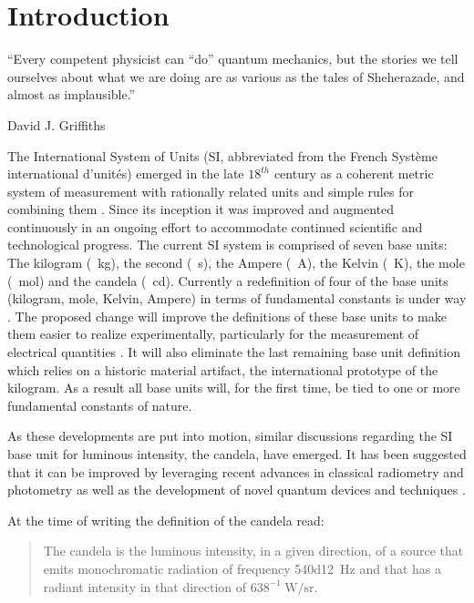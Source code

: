 

\chapter{Introduction}	\label{ch::introduction}

		\epigraph{``Every competent physicist can \enquote{do} quantum mechanics, but the stories we tell ourselves about what we are doing are as various as the tales of Sheherazade, and almost as implausible.''}{\textup{David J. Griffiths}}

		The International System of Units (SI, abbreviated from the French Syst\`eme international d'unit\'es) emerged in the late $18^{th}$ century as a coherent metric system of measurement with rationally related units and simple rules for combining them \cite{SIbrochure}. Since its inception it was improved and augmented continuously in an ongoing effort to accommodate continued scientific and technological progress. The current SI system is comprised of seven base units: The kilogram (\SI{}{\kg}), the second (\SI{}{\s}), the Ampere (\SI{}{\ampere}), the Kelvin (\SI{}{\kelvin}), the mole (\SI{}{\mole}) and the candela (\SI{}{\candela}). Currently a redefinition of four of the base units (kilogram, mole, Kelvin, Ampere) in terms of fundamental constants is under way \cite{0026-1394-44-1-010, SIHighlights2017}. The proposed change will improve the definitions of these base units to make them easier to realize experimentally, particularly for the measurement of electrical quantities \cite{zwinkels2010photometry}. It will also eliminate the last remaining base unit definition which relies on a historic material artifact, the international prototype of the kilogram. As a result all base units will, for the first time, be tied to one or more fundamental constants of nature.

		As these developments are put into motion, similar discussions regarding the SI base unit for luminous intensity, the candela, have emerged. It has been suggested that it can be improved by leveraging recent advances in classical radiometry and photometry as well as the development of novel quantum devices and techniques \cite{Cheung2007}.

		At the time of writing the definition of the candela read:

		\begin{quote}
			The candela is the luminous intensity, in a given direction, of a source that emits monochromatic radiation of frequency \SI{540d12}{\hertz} and that has a radiant intensity in that direction of $638^{-1} \SI{}{\watt\per\steradian}$.
		\end{quote}

